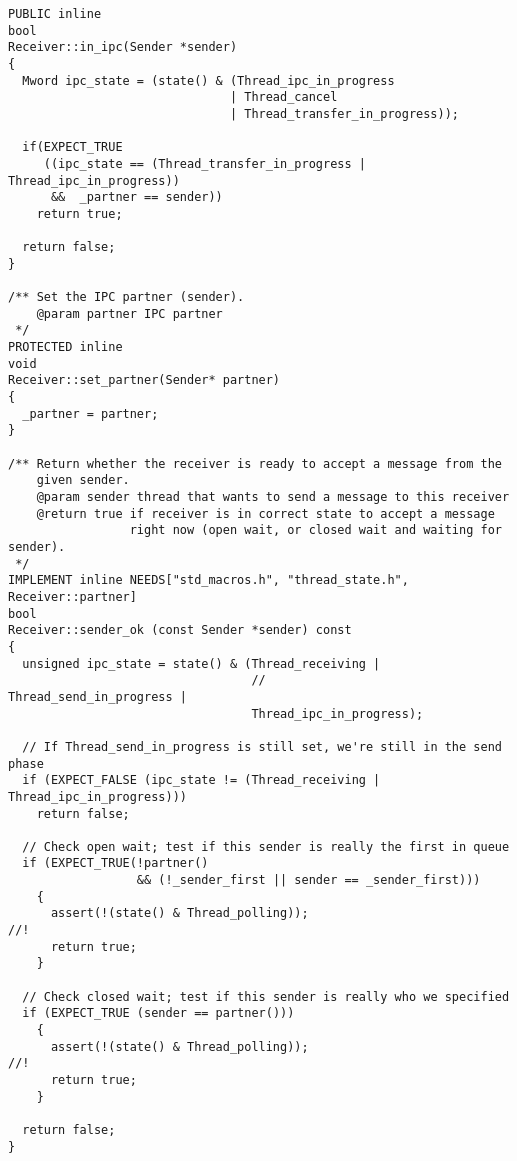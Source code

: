 \begin{lstlisting}
PUBLIC inline
bool
Receiver::in_ipc(Sender *sender)
{
  Mword ipc_state = (state() & (Thread_ipc_in_progress
                               | Thread_cancel
                               | Thread_transfer_in_progress));

  if(EXPECT_TRUE
     ((ipc_state == (Thread_transfer_in_progress | Thread_ipc_in_progress))
      &&  _partner == sender))
    return true;

  return false;
}

/** Set the IPC partner (sender).
    @param partner IPC partner
 */
PROTECTED inline 
void
Receiver::set_partner(Sender* partner)
{
  _partner = partner;
}

/** Return whether the receiver is ready to accept a message from the
    given sender.
    @param sender thread that wants to send a message to this receiver
    @return true if receiver is in correct state to accept a message 
                 right now (open wait, or closed wait and waiting for sender).
 */
IMPLEMENT inline NEEDS["std_macros.h", "thread_state.h", Receiver::partner]
bool
Receiver::sender_ok (const Sender *sender) const
{
  unsigned ipc_state = state() & (Thread_receiving |
                                  //                 Thread_send_in_progress |
                                  Thread_ipc_in_progress);

  // If Thread_send_in_progress is still set, we're still in the send phase
  if (EXPECT_FALSE (ipc_state != (Thread_receiving | Thread_ipc_in_progress)))
    return false;

  // Check open wait; test if this sender is really the first in queue
  if (EXPECT_TRUE(!partner()
                  && (!_sender_first || sender == _sender_first))) 
    {
      assert(!(state() & Thread_polling));                                 //!
      return true;
    }

  // Check closed wait; test if this sender is really who we specified
  if (EXPECT_TRUE (sender == partner()))
    {
      assert(!(state() & Thread_polling));                                 //!
      return true;
    }

  return false;
}
\end{lstlisting}